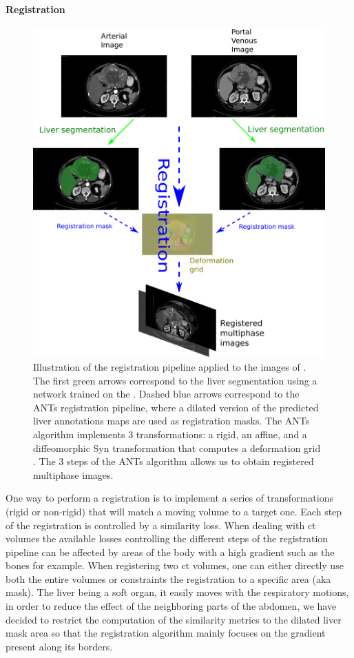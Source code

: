 \paragraph{Registration}\label{registration}

\begin{figure}[th!]
\centering
\includegraphics[width=0.7\linewidth]{../HistologicalGradePrediction/images/RegistrationTCIA_pipeline_vertical2}
\caption{Illustration of the registration pipeline applied to the images of \textbf{}. The first green arrows correspond to the liver segmentation using a network trained on the \textbf{}. Dashed blue arrows correspond to the ANTs registration pipeline, where a dilated version of the predicted liver annotations maps are used as registration masks. The ANTs algorithm implements 3 transformations: a rigid, an affine, and a diffeomorphic Syn transformation that computes a deformation grid \cite{Avants2008}. The 3 steps of the ANTs algorithm allows us to obtain registered multiphase images.}
\label{fig:RegistrationTCIA_pipeline_vertical2}
\end{figure}


One way to perform a registration is to implement a series of
transformations (rigid or non-rigid) that will match a moving volume to
a target one. Each step of the registration is controlled by a
similarity loss.
When dealing with \ac{ct} volumes the available losses controlling the
different steps of the registration pipeline can be affected by areas of
the body with a high gradient such as the bones for example. When
registering two \ac{ct} volumes, one can either directly use both the entire
volumes or constraints the registration to a specific area (aka mask).
The liver being a soft organ, it easily moves with the respiratory
motions, in order to reduce the effect of the neighboring parts of the
abdomen, we have decided to restrict the computation of the similarity
metrics to the dilated liver mask area so that the registration
algorithm mainly focuses on the gradient present along its borders.

